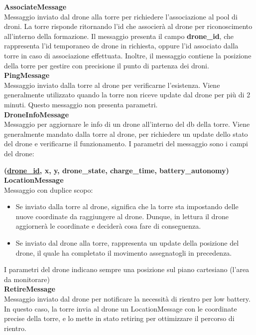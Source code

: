 \documentclass[a4paper, 11pt]{article}
\begin{document}
\textbf{AssociateMessage}\\
Messaggio inviato dal drone alla torre per richiedere l'associazione al pool di droni.
La torre risponde ritornando l'id che associerà al drone per riconoscimento all'interno della formazione.
Il messaggio presenta il campo \textbf{drone\_id}, che rappresenta l'id temporaneo de drone in richiesta, oppure l'id associato dalla torre in caso di associazione effettuata.
Inoltre, il messaggio contiene la posizione della torre per gestire con precisione il punto di partenza dei droni.\\

\textbf{PingMessage}\\
Messaggio inviato dalla torre al drone per verificarne l'esistenza. Viene generalmente utilizzato quando la torre non riceve update dal drone per più di 2 minuti.
Questo messaggio non presenta parametri.\\

\textbf{DroneInfoMessage}\\
Messaggio per aggiornare le info di un drone all'interno del db della torre. Viene generalmente mandato dalla torre al drone, per richiedere un update dello stato del drone e verificarne il funzionamento.
I parametri del messaggio sono i campi del drone:

\indent \textbf{(\underline{drone\_id}, x, y, drone\_state, charge\_time, battery\_autonomy)}\\

\textbf{LocationMessage}\\
Messaggio con duplice scopo:
\begin{itemize}
    \item Se inviato dalla torre al drone, significa che la torre sta impostando delle nuove coordinate da raggiungere al drone. Dunque, in lettura il drone aggiornerà le coordinate e deciderà cosa fare di conseguenza.
    \item Se inviato dal drone alla torre, rappresenta un update della posizione del drone, il quale ha completato il movimento assegnatogli in precedenza.
\end{itemize}
I parametri del drone indicano sempre una posizione sul piano cartesiano (l'area da monitorare)\\

\textbf{RetireMessage}\\
Messaggio inviato dal drone per notificare la necessità di rientro per low battery.
In questo caso, la torre invia al drone un LocationMessage con le coordinate precise della torre, e lo mette in stato retiring per ottimizzare il percorso di rientro.\\
\end{document}
